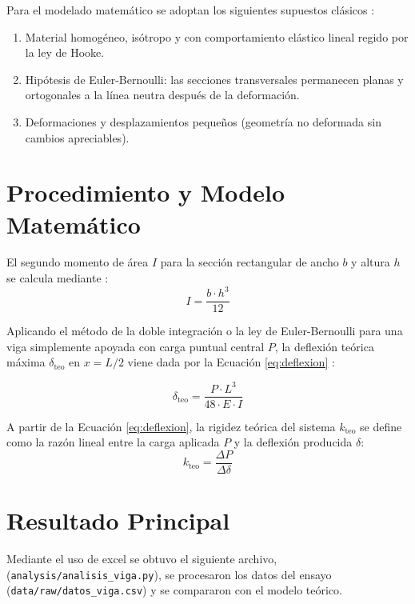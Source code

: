 \documentclass[11pt, a4paper]{article}
\begin{document}
Para el modelado matemático se adoptan los siguientes supuestos clásicos \cite{hibbeler2017}:
\begin{enumerate}
    \item Material homogéneo, isótropo y con comportamiento elástico lineal regido por la ley de Hooke.
    \item Hipótesis de Euler-Bernoulli: las secciones transversales permanecen planas y ortogonales a la línea neutra después de la deformación.
    \item Deformaciones y desplazamientos pequeños (geometría no deformada sin cambios apreciables).
\end{enumerate}

\section{Procedimiento y Modelo Matemático}
El segundo momento de área $I$ para la sección rectangular de ancho $b$ y altura $h$ se calcula mediante \cite{hibbeler2017}:
\begin{equation}
I = \frac{b \cdot h^3}{12}
\label{eq:momento_inercia}
\end{equation}

Aplicando el método de la doble integración o la ley de Euler-Bernoulli para una viga simplemente apoyada con carga puntual central $P$, la deflexión teórica máxima $\delta_{\text{teo}}$ en $x = L/2$ viene dada por la Ecuación \ref{eq:deflexion} \cite{hibbeler2017}:

\begin{equation}
\delta_{\text{teo}} = \frac{P \cdot L^3}{48 \cdot E \cdot I}
\label{eq:deflexion}
\end{equation}

A partir de la Ecuación \ref{eq:deflexion}, la rigidez teórica del sistema $k_{\text{teo}}$ se define como la razón lineal entre la carga aplicada $P$ y la deflexión producida $\delta$:
\begin{equation}
k_{\text{teo}} = \frac{\Delta P}{\Delta \delta}
\label{eq:rigidez}
\end{equation}

\section{Resultado Principal}
Mediante el uso de excel se obtuvo el siguiente archivo, (\texttt{analysis/analisis\_viga.py}), se procesaron los datos del ensayo (\texttt{data/raw/datos\_viga.csv}) y se compararon con el modelo teórico. 
\end{document}
